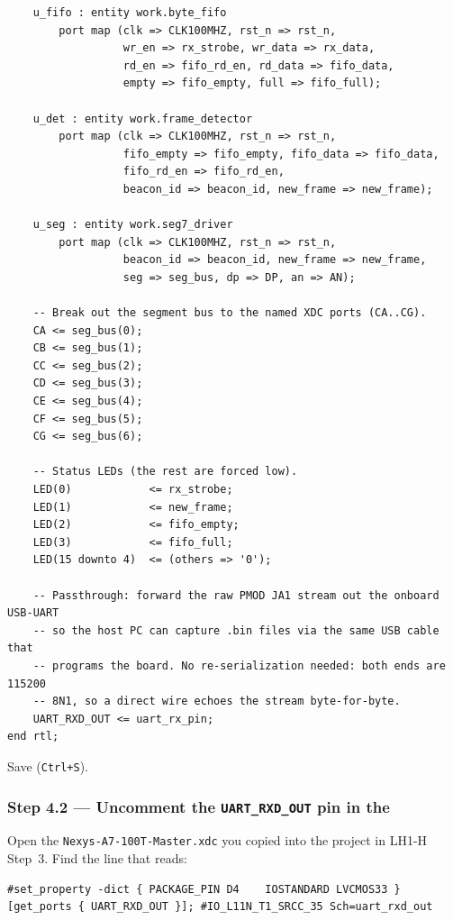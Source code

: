\documentclass[11pt,letterpaper]{article}
\begin{document}
\begin{lstlisting}
    u_fifo : entity work.byte_fifo
        port map (clk => CLK100MHZ, rst_n => rst_n,
                  wr_en => rx_strobe, wr_data => rx_data,
                  rd_en => fifo_rd_en, rd_data => fifo_data,
                  empty => fifo_empty, full => fifo_full);

    u_det : entity work.frame_detector
        port map (clk => CLK100MHZ, rst_n => rst_n,
                  fifo_empty => fifo_empty, fifo_data => fifo_data,
                  fifo_rd_en => fifo_rd_en,
                  beacon_id => beacon_id, new_frame => new_frame);

    u_seg : entity work.seg7_driver
        port map (clk => CLK100MHZ, rst_n => rst_n,
                  beacon_id => beacon_id, new_frame => new_frame,
                  seg => seg_bus, dp => DP, an => AN);

    -- Break out the segment bus to the named XDC ports (CA..CG).
    CA <= seg_bus(0);
    CB <= seg_bus(1);
    CC <= seg_bus(2);
    CD <= seg_bus(3);
    CE <= seg_bus(4);
    CF <= seg_bus(5);
    CG <= seg_bus(6);

    -- Status LEDs (the rest are forced low).
    LED(0)            <= rx_strobe;
    LED(1)            <= new_frame;
    LED(2)            <= fifo_empty;
    LED(3)            <= fifo_full;
    LED(15 downto 4)  <= (others => '0');

    -- Passthrough: forward the raw PMOD JA1 stream out the onboard USB-UART
    -- so the host PC can capture .bin files via the same USB cable that
    -- programs the board. No re-serialization needed: both ends are 115200
    -- 8N1, so a direct wire echoes the stream byte-for-byte.
    UART_RXD_OUT <= uart_rx_pin;
end rtl;
\end{lstlisting}

Save (\texttt{Ctrl+S}).

\subsubsection*{Step 4.2 --- Uncomment the \texttt{UART\_RXD\_OUT} pin in the \XDC{}}

Open the \texttt{Nexys-A7-100T-Master.xdc} you copied into the project in LH1-H Step~3. Find the line that reads:

\begin{lstlisting}[language={[Sharp]C}, basicstyle=\scriptsize\ttfamily]
#set_property -dict { PACKAGE_PIN D4    IOSTANDARD LVCMOS33 } [get_ports { UART_RXD_OUT }]; #IO_L11N_T1_SRCC_35 Sch=uart_rxd_out
\end{lstlisting}
\end{document}
